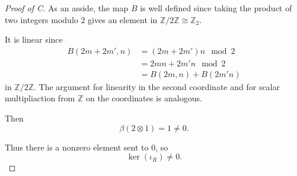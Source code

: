 \documentclass[11pt]{article}
\begin{document}
\begin{proof}[Proof of C]
    As an asside, the map $B$ is well defined 
    since taking the product of two 
    integers modulo $2$ gives an element in 
    $\mathbb Z/2\mathbb Z \cong \mathbb Z_2$. 
    
    It is linear since 
    \begin{align*}
        B(2m + 2m', n) 
        &= (2m + 2m')n \mod 2 \\ 
        &= 2mn + 2m'n \mod 2 \\ 
        &= B(2m, n) + B(2m'n) 
    \end{align*}    
    in $\mathbb Z/2\mathbb Z$. 
    The argument for linearity in the second 
    coordinate and for scalar multipliaction 
    from $\mathbb Z$ on the coordinates 
    is analogous.
    
    Then 
    \[
        \beta(2\otimes 1) = 1 \neq 0. 
    \]

    Thus there is a nonzero element sent to $0$, so 
    \[
        \ker(\iota_R) \neq 0. 
    \]


\end{proof}
\end{document}
